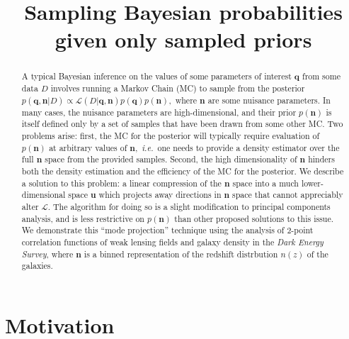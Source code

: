 \documentclass[linenumbers, onecolumn]{aastex7}
\newcommand{\ie}{\textit{i.e.}}
\newcommand{\vecq}{\ensuremath{\mathbf{q}}}
\newcommand{\vecn}{\ensuremath{\mathbf{n}}}
\newcommand{\vecu}{\ensuremath{\mathbf{u}}}
\newcommand{\likeli}{\mathcal{L}}
\begin{document}
\title{Sampling Bayesian probabilities given only sampled priors}




\begin{abstract}
	\vspace{0.2in}
A typical Bayesian inference on the values of some parameters of
interest $\vecq$ from some data $D$ involves running a Markov Chain (MC) to sample
from the posterior $p(\vecq,\vecn | D) \propto \likeli(D | \vecq,\vecn)
p(\vecq) p(\vecn),$ where $\vecn$ are some nuisance parameters.  In
many cases, the nuisance parameters are high-dimensional, and their
prior $p(\vecn)$ is itself defined only by a set of samples that have
been drawn from some other MC.  Two problems arise: first,
the MC for the posterior will typically require evaluation of
$p(\vecn)$ at arbitrary values of $\vecn,$ \ie\ one needs to provide a
density estimator over the full $\vecn$ space from the provided
samples.  Second, the high dimensionality of $\vecn$ hinders both the
density estimation and the efficiency of the MC for the posterior.  We
describe a solution to this problem: a linear compression of the
$\vecn$ space into a much lower-dimensional space $\vecu$ which
projects away directions in $\vecn$ space that cannot appreciably
alter $\likeli.$ The algorithm for doing so is a slight modification
to principal components analysis, and is less restrictive on
$p(\vecn)$ than other proposed solutions to this issue.
We demonstrate this ``mode projection'' technique using the analysis
of 2-point correlation functions of weak lensing fields and galaxy
density in the \textit{Dark Energy Survey}, where $\vecn$ is a binned representation of the redshift distrbution
$n(z)$ of the galaxies.
\end{abstract}
\reportnum{}

\section{Motivation} \label{sec:intro}
\end{document}
